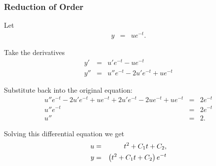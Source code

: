 \begin{frame}
  \frametitle{Reduction of Order}

  Let 
  \begin{eqnarray*}
    y & = & u e^{-t}.
  \end{eqnarray*}

  Take the derivatives
  \begin{eqnarray*}
    y' & = & u' e^{-t} - u e^{-t} \\
    y'' & = & u'' e^{-t} - 2 u' e^{-t} + u e^{-t}
  \end{eqnarray*}

  Substitute back into the original equation:
  \begin{eqnarray*}
    u'' e^{-t} - 2 u' e^{-t} + u e^{-t} + 2 u' e^{-t} - 2ue^{-t} + u e^{-t} & = & 2 e^{-t}    \\
    u'' e^{-t} & = & 2 e^{-t} \\
    u'' & = & 2.
  \end{eqnarray*}

\end{frame}

\begin{frame}

  Solving this differential equation we get
  \begin{eqnarray*}
    u & = & t^2 + C_1 t + C_2, \\
    y & = & \left(  t^2 + C_1 t + C_2 \right) e^{-t}
  \end{eqnarray*}
  
\end{frame}



